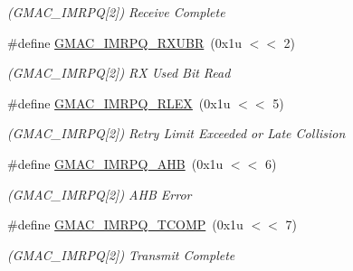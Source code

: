 \begin{DoxyCompactItemize}
\begin{DoxyCompactList}\small\item\em (G\+M\+A\+C\+\_\+\+I\+M\+R\+PQ\mbox{[}2\mbox{]}) Receive Complete \end{DoxyCompactList}\item 
\mbox{\label{group__SAME70__GMAC_ga3a54453222a4d223ec6c9c354dfcb48c}} 
\#define \mbox{\hyperlink{group__SAME70__GMAC_ga3a54453222a4d223ec6c9c354dfcb48c}{G\+M\+A\+C\+\_\+\+I\+M\+R\+P\+Q\+\_\+\+R\+X\+U\+BR}}~(0x1u $<$$<$ 2)
\begin{DoxyCompactList}\small\item\em (G\+M\+A\+C\+\_\+\+I\+M\+R\+PQ\mbox{[}2\mbox{]}) RX Used Bit Read \end{DoxyCompactList}\item 
\mbox{\label{group__SAME70__GMAC_gadb7a85f9d69c562afaf85baee0c617c9}} 
\#define \mbox{\hyperlink{group__SAME70__GMAC_gadb7a85f9d69c562afaf85baee0c617c9}{G\+M\+A\+C\+\_\+\+I\+M\+R\+P\+Q\+\_\+\+R\+L\+EX}}~(0x1u $<$$<$ 5)
\begin{DoxyCompactList}\small\item\em (G\+M\+A\+C\+\_\+\+I\+M\+R\+PQ\mbox{[}2\mbox{]}) Retry Limit Exceeded or Late Collision \end{DoxyCompactList}\item 
\mbox{\label{group__SAME70__GMAC_ga27358355df4d424999b6da117b4ce991}} 
\#define \mbox{\hyperlink{group__SAME70__GMAC_ga27358355df4d424999b6da117b4ce991}{G\+M\+A\+C\+\_\+\+I\+M\+R\+P\+Q\+\_\+\+A\+HB}}~(0x1u $<$$<$ 6)
\begin{DoxyCompactList}\small\item\em (G\+M\+A\+C\+\_\+\+I\+M\+R\+PQ\mbox{[}2\mbox{]}) A\+HB Error \end{DoxyCompactList}\item 
\mbox{\label{group__SAME70__GMAC_ga292feecb9454427b62804f647e5508a0}} 
\#define \mbox{\hyperlink{group__SAME70__GMAC_ga292feecb9454427b62804f647e5508a0}{G\+M\+A\+C\+\_\+\+I\+M\+R\+P\+Q\+\_\+\+T\+C\+O\+MP}}~(0x1u $<$$<$ 7)
\begin{DoxyCompactList}\small\item\em (G\+M\+A\+C\+\_\+\+I\+M\+R\+PQ\mbox{[}2\mbox{]}) Transmit Complete \end{DoxyCompactList}\item 

\end{DoxyCompactItemize}
